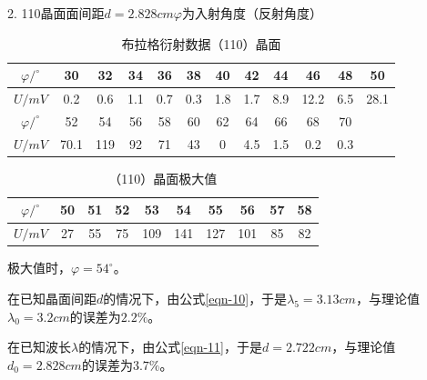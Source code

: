 \documentclass[11pt]{article}
\begin{document}
\par
2. 110晶面\qquad 面间距$d=2.828cm$\qquad $\varphi$为入射角度（反射角度）
\begin{table}[H]
    \centering
    \caption{布拉格衍射数据（110）晶面}
    \begin{tabular}{|c|c|c|c|c|c|c|c|c|c|c|c|}
    \hline
        $\varphi /^\circ$ & 30 & 32 & 34 & 36 & 38 & 40 & 42 & 44 & 46 & 48 & 50 \\ \hline
        $U/mV$ & 0.2 & 0.6 & 1.1 & 0.7 & 0.3 & 1.8 & 1.7 & 8.9 & 12.2 & 6.5 & 28.1 \\ \hline
        $\varphi /^\circ$ & 52 & 54 & 56 & 58 & 60 & 62 & 64 & 66 & 68 & 70 & ~ \\ \hline
        $U/mV$ & 70.1 & 119 & 92 & 71 & 43 & 0 & 4.5 & 1.5 & 0.2 & 0.3 & ~ \\ \hline
    \end{tabular}
\end{table}
\begin{table}[H]
    \centering
    \caption{（110）晶面极大值}
    \begin{tabular}{|c|c|c|c|c|c|c|c|c|c|}
    \hline
        $\varphi /^\circ$ & 50 & 51 & 52 & 53 & 54 & 55 & 56 & 57 & 58 \\ \hline
        $U/mV$ & 27 & 55 & 75 & 109 & 141 & 127 & 101 & 85 & 82 \\ \hline
    \end{tabular}
\end{table}
    \par 极大值时，$\varphi=54^\circ$。
    \par 在已知晶面间距$d$的情况下，由公式\eqref{eqn-10}，于是$\lambda_5=3.13cm$，与理论值$\lambda_0=3.2cm$的误差为$2.2\%$。
    \par 在已知波长$\lambda$的情况下，由公式\eqref{eqn-11}，于是$d=2.722cm$，与理论值$d_0=2.828cm$的误差为$3.7\%$。
\end{document}
